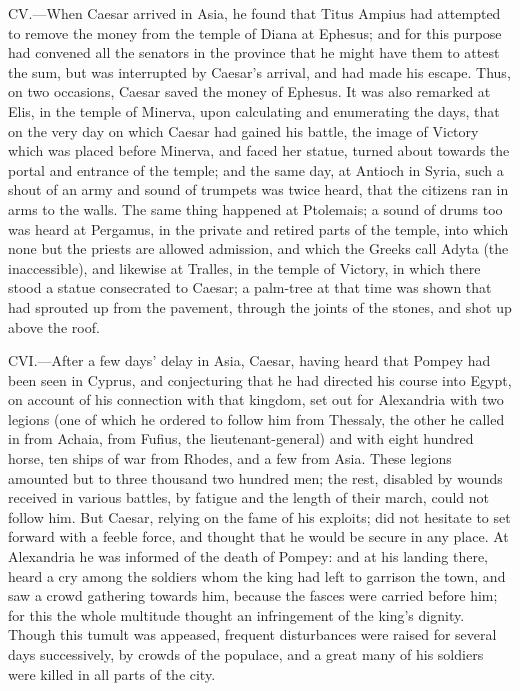CV.—When Caesar arrived in Asia, he found that Titus Ampius had
attempted to remove the money from the temple of Diana at Ephesus; and
for this purpose had convened all the senators in the province that he
might have them to attest the sum, but was interrupted by Caesar's
arrival, and had made his escape. Thus, on two occasions, Caesar saved
the money of Ephesus. It was also remarked at Elis, in the temple of
Minerva, upon calculating and enumerating the days, that on the very day
on which Caesar had gained his battle, the image of Victory which was
placed before Minerva, and faced her statue, turned about towards the
portal and entrance of the temple; and the same day, at Antioch in
Syria, such a shout of an army and sound of trumpets was twice heard,
that the citizens ran in arms to the walls. The same thing happened at
Ptolemais; a sound of drums too was heard at Pergamus, in the private
and retired parts of the temple, into which none but the priests are
allowed admission, and which the Greeks call Adyta (the inaccessible),
and likewise at Tralles, in the temple of Victory, in which there stood
a statue consecrated to Caesar; a palm-tree at that time was shown that
had sprouted up from the pavement, through the joints of the stones, and
shot up above the roof.

CVI.—After a few days' delay in Asia, Caesar, having heard that Pompey
had been seen in Cyprus, and conjecturing that he had directed his
course into Egypt, on account of his connection with that kingdom, set
out for Alexandria with two legions (one of which he ordered to follow
him from Thessaly, the other he called in from Achaia, from Fufius, the
lieutenant-general) and with eight hundred horse, ten ships of war from
Rhodes, and a few from Asia. These legions amounted but to three
thousand two hundred men; the rest, disabled by wounds received in
various battles, by fatigue and the length of their march, could not
follow him. But Caesar, relying on the fame of his exploits; did not
hesitate to set forward with a feeble force, and thought that he would
be secure in any place. At Alexandria he was informed of the death of
Pompey: and at his landing there, heard a cry among the soldiers whom
the king had left to garrison the town, and saw a crowd gathering
towards him, because the fasces were carried before him; for this the
whole multitude thought an infringement of the king's dignity. Though
this tumult was appeased, frequent disturbances were raised for several
days successively, by crowds of the populace, and a great many of his
soldiers were killed in all parts of the city.

